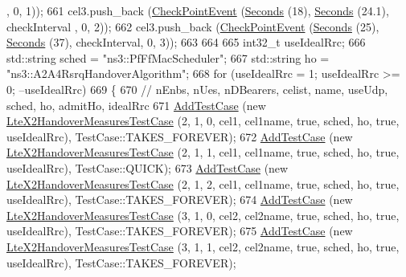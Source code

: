 \begin{DoxyCode}
      , 0, 1));
661   cel3.push\_back (\hyperlink{structCheckPointEvent}{CheckPointEvent} (\hyperlink{group__timecivil_ga33c34b816f8ff6628e33d5c8e9713b9e}{Seconds} (18), \hyperlink{group__timecivil_ga33c34b816f8ff6628e33d5c8e9713b9e}{Seconds} (24.1), checkInterval
      , 0, 2));
662   cel3.push\_back (\hyperlink{structCheckPointEvent}{CheckPointEvent} (\hyperlink{group__timecivil_ga33c34b816f8ff6628e33d5c8e9713b9e}{Seconds} (25), \hyperlink{group__timecivil_ga33c34b816f8ff6628e33d5c8e9713b9e}{Seconds} (37), checkInterval, 
      0, 3));
663 
664 
665   int32\_t useIdealRrc;
666   std::string sched = \textcolor{stringliteral}{"ns3::PfFfMacScheduler"};
667   std::string ho = \textcolor{stringliteral}{"ns3::A2A4RsrqHandoverAlgorithm"};
668   \textcolor{keywordflow}{for} (useIdealRrc = 1; useIdealRrc >= 0; --useIdealRrc)
669     \{
670       \textcolor{comment}{//                                          nEnbs, nUes, nDBearers, celist, name, useUdp, sched, ho,
       admitHo, idealRrc}
671       \hyperlink{classns3_1_1TestCase_a3718088e3eefd5d6454569d2e0ddd835}{AddTestCase} (\textcolor{keyword}{new} \hyperlink{classLteX2HandoverMeasuresTestCase}{LteX2HandoverMeasuresTestCase} (2,   1,    0,
          cel1, cel1name, \textcolor{keyword}{true}, sched, ho, \textcolor{keyword}{true}, useIdealRrc), TestCase::TAKES\_FOREVER);
672       \hyperlink{classns3_1_1TestCase_a3718088e3eefd5d6454569d2e0ddd835}{AddTestCase} (\textcolor{keyword}{new} \hyperlink{classLteX2HandoverMeasuresTestCase}{LteX2HandoverMeasuresTestCase} (2,   1,    1,
          cel1, cel1name, \textcolor{keyword}{true}, sched, ho, \textcolor{keyword}{true}, useIdealRrc), TestCase::QUICK);
673       \hyperlink{classns3_1_1TestCase_a3718088e3eefd5d6454569d2e0ddd835}{AddTestCase} (\textcolor{keyword}{new} \hyperlink{classLteX2HandoverMeasuresTestCase}{LteX2HandoverMeasuresTestCase} (2,   1,    2,
          cel1, cel1name, \textcolor{keyword}{true}, sched, ho, \textcolor{keyword}{true}, useIdealRrc), TestCase::TAKES\_FOREVER);
674       \hyperlink{classns3_1_1TestCase_a3718088e3eefd5d6454569d2e0ddd835}{AddTestCase} (\textcolor{keyword}{new} \hyperlink{classLteX2HandoverMeasuresTestCase}{LteX2HandoverMeasuresTestCase} (3,   1,    0,
          cel2, cel2name, \textcolor{keyword}{true}, sched, ho, \textcolor{keyword}{true}, useIdealRrc), TestCase::TAKES\_FOREVER);
675       \hyperlink{classns3_1_1TestCase_a3718088e3eefd5d6454569d2e0ddd835}{AddTestCase} (\textcolor{keyword}{new} \hyperlink{classLteX2HandoverMeasuresTestCase}{LteX2HandoverMeasuresTestCase} (3,   1,    1,
          cel2, cel2name, \textcolor{keyword}{true}, sched, ho, \textcolor{keyword}{true}, useIdealRrc), TestCase::TAKES\_FOREVER);

\end{DoxyCode}
